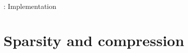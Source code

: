 \documentclass{beamer}
\newcommand{\real}{\mathbb{R}}
\newcommand{\cplx}{\mathbb{C}}
\newcommand{\conj}[1]{\overline{#1}}
\begin{document}
\begin{frame}[c]{\insertsection: Implementation}



\end{frame}


\section{Sparsity and compression} %
\label{sec:compression}
\end{document}
